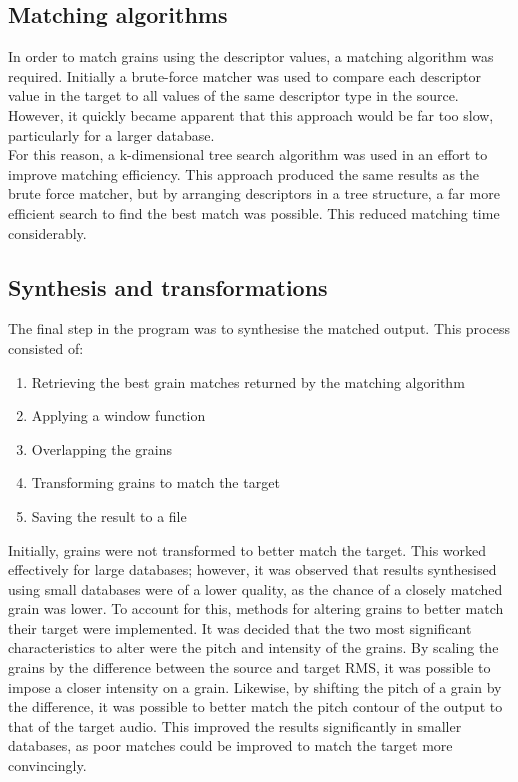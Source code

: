 \documentclass{scrartcl}
\begin{document}
    \subsection*{Matching algorithms}
    In order to match grains using the descriptor values, a matching algorithm
    was required. Initially a brute-force matcher was used to compare each
    descriptor value in the target to all values of the same descriptor type in
    the source. However, it quickly became apparent that this approach would be
    far too slow, particularly for a larger database.\\
    For this reason, a k-dimensional tree search algorithm was used in an
    effort to improve matching efficiency.  This approach produced the same
    results as the brute force matcher, but by arranging descriptors in a tree
    structure, a far more efficient search to find the best match was possible.
    This reduced matching time considerably.

    \subsection*{Synthesis and transformations} \label{sat}
    The final step in the program was to synthesise the matched output.
    This process consisted of:
    \begin{enumerate}
        \item Retrieving the best grain matches returned by the matching algorithm
        \item Applying a window function
        \item Overlapping the grains 
        \item Transforming grains to match the target
        \item Saving the result to a file
    \end{enumerate}
    Initially, grains were not transformed to better match the target.  This
    worked effectively for large databases; however, it was observed that
    results synthesised using small databases were of a lower quality, as the
    chance of a closely matched grain was lower. To account for this, methods
    for altering grains to better match their target were implemented.  It was
    decided that the two most significant characteristics to alter were the
    pitch and intensity of the grains.  By scaling the grains by the difference
    between the source and target RMS, it was possible to impose a closer
    intensity on a grain. Likewise, by shifting the pitch of a grain by the
    difference, it was possible to better match the pitch contour of the output
    to that of the target audio.  This improved the results significantly in
    smaller databases, as poor matches could be improved to match the target
    more convincingly.
\end{document}
